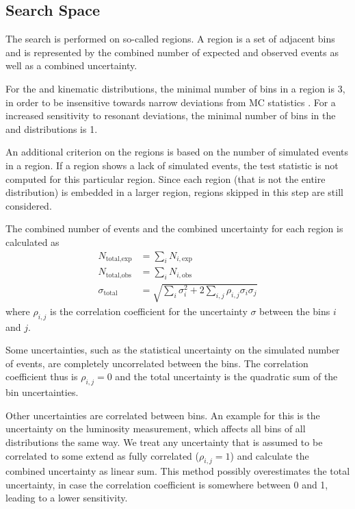 \subsection{Search Space}
The search is performed on so-called regions. A region is a set of adjacent bins and is represented by the combined number of expected and observed events as well as a combined uncertainty.

For the \sumpT and \MET kinematic distributions, the minimal number of bins in a region is \num{3}, in order to be insensitive towards narrow deviations from \ac{MC} statistics .
For a increased sensitivity to resonant deviations, the minimal number of bins in the \Minv and \MT distributions is \num{1}.

An additional criterion on the regions is based on the number of simulated events in a region. If a region shows a lack of simulated events, the test statistic is not computed for this particular region. Since each region (that is not the entire distribution) is embedded in a larger region, regions skipped in this step are still considered. 

The combined number of events and the combined uncertainty for each region is calculated as
\begin{align}
     N_{\text{total},\text{exp}} &= \sum_i N_{i, \text{exp}} \\   
     N_{\text{total},\text{obs}} &= \sum_i N_{i, \text{obs}} \\
     \sigma_\text{total} &= \sqrt{\sum_i \sigma_i^2 + 2 \sum_{i,j} \rho_{i,j}\sigma_i\sigma_j}
\end{align}
where $\rho_{i,j}$ is the correlation coefficient for the uncertainty $\sigma$ between the bins $i$ and $j$.

Some uncertainties, such as the statistical uncertainty on the simulated number of events, are completely uncorrelated between the bins. The correlation coefficient thus is $\rho_{i,j} = 0$ and the total uncertainty is the quadratic sum of the bin uncertainties.

Other uncertainties are correlated between bins. An example for this is the uncertainty on the luminosity measurement, which affects all bins of all distributions the same way. We treat any uncertainty that is assumed to be correlated to some extend as fully correlated ($\rho_{i,j} = 1$) and calculate the combined uncertainty as linear sum. This method possibly overestimates the total uncertainty, in case the correlation coefficient is somewhere between 0 and 1, leading to a lower  sensitivity.

